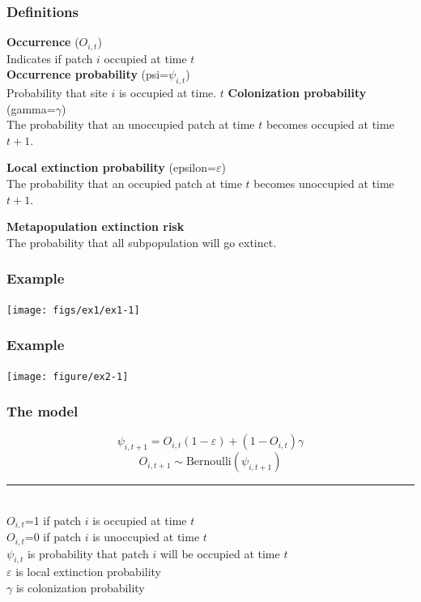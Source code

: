 \documentclass[color=usenames,dvipsnames]{beamer}\usepackage[]{graphicx}\usepackage[]{xcolor}
\newenvironment{knitrout}{}{} %
\begin{document}
\begin{frame}
  \frametitle{Definitions}
  {\bf Occurrence} ($O_{i,t}$) \\
  Indicates if patch $i$ occupied at time $t$  \\
  \pause
  \vfill
  {\bf Occurrence probability} (psi=$\psi_{i,t}$) \\
  Probability that site $i$ is occupied at time. $t$
  \pause
  \vfill
  {\bf Colonization probability} (gamma=$\gamma$) \\
  The probability that an unoccupied patch at time $t$ becomes occupied
  at time $t+1$. \par
  \pause
  \vfill
  {\bf Local extinction probability} (epsilon=$\varepsilon$) \\
  The probability that an occupied patch at time $t$ becomes
  unoccupied at time $t+1$. \par
  \pause
  \vfill
  {\bf Metapopulation extinction risk} \\
  The probability that all subpopulation will go extinct.
\end{frame}




\begin{frame}[fragile]
  \frametitle{Example}
  \vspace{-1cm}

\texttt{[image: figs/ex1/ex1-1]}
\end{frame}



\begin{frame}[fragile]
  \frametitle{Example}
\begin{knitrout}
\color{fgcolor}

\texttt{[image: figure/ex2-1]} \hfill{}


\end{knitrout}
\end{frame}







\begin{frame}
  \frametitle{The model}
  \[
    \psi_{i,t+1} = O_{i,t}(1-\varepsilon) + (1-O_{i,t})\gamma
  \]
  \[
    O_{i,t+1} \sim \mbox{Bernoulli}(\psi_{i,t+1})
  \]
  \vspace{0.5cm}
  \rule{0.5\textwidth}{1pt} \\
  $O_{i,t}$=1 if patch $i$ is occupied at time $t$ \\
  $O_{i,t}$=0 if patch $i$ is unoccupied at time $t$ \\
  $\psi_{i,t}$ is probability that patch $i$ will be occupied at time
  $t$ \\
  $\varepsilon$ is local extinction probability \\
  $\gamma$ is colonization probability
\end{frame}
\end{document}
